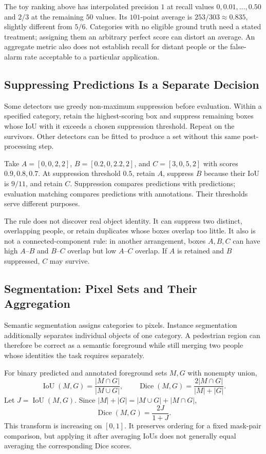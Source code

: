 The toy ranking above has interpolated precision $1$ at recall values $0,0.01,\ldots,0.50$ and $2/3$ at the remaining $50$ values. Its $101$-point average is $253/303\approx0.835$, slightly different from $5/6$. Categories with no eligible ground truth need a stated treatment; assigning them an arbitrary perfect score can distort an average. An aggregate metric also does not establish recall for distant people or the false-alarm rate acceptable to a particular application.

\subsection{Suppressing Predictions Is a Separate Decision}

Some detectors use greedy non-maximum suppression before evaluation. Within a specified category, retain the highest-scoring box and suppress remaining boxes whose IoU with it exceeds a chosen suppression threshold. Repeat on the survivors. Other detectors can be fitted to produce a set without this same post-processing step.

Take $A=[0,0,2,2]$, $B=[0.2,0,2.2,2]$, and $C=[3,0,5,2]$ with scores $0.9,0.8,0.7$. At suppression threshold $0.5$, retain $A$, suppress $B$ because their IoU is $9/11$, and retain $C$. Suppression compares predictions with predictions; evaluation matching compares predictions with annotations. Their thresholds serve different purposes.

The rule does not discover real object identity. It can suppress two distinct, overlapping people, or retain duplicates whose boxes overlap too little. It also is not a connected-component rule: in another arrangement, boxes $A,B,C$ can have high $A$--$B$ and $B$--$C$ overlap but low $A$--$C$ overlap. If $A$ is retained and $B$ suppressed, $C$ may survive.

\subsection{Segmentation: Pixel Sets and Their Aggregation}

Semantic segmentation assigns categories to pixels. Instance segmentation additionally separates individual objects of one category. A pedestrian region can therefore be correct as a semantic foreground while still merging two people whose identities the task requires separately.

For binary predicted and annotated foreground sets $M,G$ with nonempty union,
\[
\operatorname{IoU}(M,G)=\frac{|M\cap G|}{|M\cup G|},\qquad
\operatorname{Dice}(M,G)=\frac{2|M\cap G|}{|M|+|G|}.
\]
Let $J=\operatorname{IoU}(M,G)$. Since $|M|+|G|=|M\cup G|+|M\cap G|$,
\[
\operatorname{Dice}(M,G)=\frac{2J}{1+J}.
\]
This transform is increasing on $[0,1]$. It preserves ordering for a fixed mask-pair comparison, but applying it after averaging IoUs does not generally equal averaging the corresponding Dice scores.

